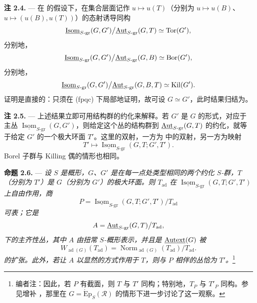 \medskip\noindent\textbf{注 2.4.} ---
在  的假设下，在集合层面记作 \(u\mapsto u(T)\)（分别为 \(u\mapsto u(B)\)、\(u\mapsto(u(B),u(T))\)）的态射诱导同构
\[
  \underline{\operatorname{Isom}}_{S\text{-}\mathrm{gr}}(G,G')
  \big/
  \underline{\operatorname{Aut}}_{S\text{-}\mathrm{gr}}(G,T)
  \simeq \operatorname{Tor}(G'),
\]
分别地，
\[
  \underline{\operatorname{Isom}}_{S\text{-}\mathrm{gr}}(G,G')
  \big/
  \underline{\operatorname{Aut}}_{S\text{-}\mathrm{gr}}(G,B)
  \simeq \operatorname{Bor}(G'),
\]
分别地，
\[
  \underline{\operatorname{Isom}}_{S\text{-}\mathrm{gr}}(G,G')
  \big/
  \underline{\operatorname{Aut}}_{S\text{-}\mathrm{gr}}(G,B,T)
  \simeq \operatorname{Kil}(G').
\]
证明是直接的：只须在 \textup{(fpqc)} 下局部地证明，故可设 \(G\simeq G'\)，此时结果归结为。

\medskip\noindent\textbf{注 2.5.} ---
上述结果立即可用结构群的约化来解释。若 \(G'\) 是 \(G\) 的形式，对应于主丛 \(\underline{\operatorname{Isom}}_{S\text{-}\mathrm{gr}}(G,G')\)，则给定这个丛的结构群到 \(\underline{\operatorname{Aut}}_{S\text{-}\mathrm{gr}}(G,T)\) 的约化，就等于给定 \(G'\) 的一个极大环面 \(T'\)。这里的双射，一方为  中的双射，另一方为映射
\[
  T'\longmapsto
  \underline{\operatorname{Isom}}_{S\text{-}\mathrm{gr}}
    (G,T;G',T').
\]
Borel 子群与 Killing 偶的情形也相同。

\medskip\noindent\textbf{命题 2.6.} ---
{\itshape 设 \(S\) 是概形，\(G\)、\(G'\) 是在每一点处类型相同的两个约化 \(S\)-群，\(T\)（分别为 \(T'\)）是 \(G\)（分别为 \(G'\)）的极大环面。则 \(T_{\mathrm{ad}}\) 在 \(\underline{\operatorname{Isom}}_{S\text{-}\mathrm{gr}}(G,T;G',T')\) 上自由作用，商}
\[
  P=
  \underline{\operatorname{Isom}}_{S\text{-}\mathrm{gr}}
    (G,T;G',T')
  \big/T_{\mathrm{ad}}
\]
{\itshape 可表；它是}
\[
  A=
  \underline{\operatorname{Aut}}_{S\text{-}\mathrm{gr}}(G,T)
  \big/T_{\mathrm{ad}},
\]
{\itshape 下的主齐性丛，其中 \(A\) 由扭常 \(S\)-概形表示，并且是 \(\underline{\operatorname{Autext}}(G)\) 被}
\[
  W_{\operatorname{ad}(G)}(T_{\mathrm{ad}})
  =
  \operatorname{Norm}_{\operatorname{ad}(G)}(T_{\mathrm{ad}})
  \big/T_{\mathrm{ad}}.
\]
{\itshape 的扩张。此外，若让 \(A\) 以显然的方式作用于 \(T\)，则与 \(P\) 相伴的丛恰为 \(T'\)。}\footnote{编者注：因此，若 \(P\) 有截面，则 \(T\) 与 \(T'\) 同构；特别地，\(T_P\) 与 \(T'_P\) 同构。参见增补 ，那里在 \(G=\operatorname{\acute{E}p}_S(\mathscr R)\) 的情形下进一步讨论了这一观察。}

